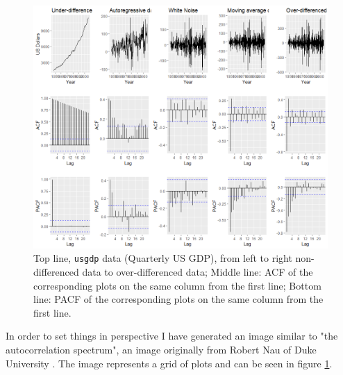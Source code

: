 \documentclass[12pt,a4paper,titlepage]{report}
\begin{document}
\begin{figure}[h]
    \centering
    \includegraphics[width=1\textwidth]{darmadynamics}
    \caption{Top line, \texttt{usgdp} data (Quarterly US GDP), from left to right non-differenced data to over-differenced data; Middle line: ACF of the corresponding plots on the same column from the first line; Bottom line: PACF of the corresponding plots on the same column from the first line.}
    \label{armadynamics}
\end{figure}

In order to set things in perspective I have generated an image similar to "the autocorrelation spectrum", an image originally from Robert Nau of Duke University \cite{nauspectrum}. The image represents a grid of plots and can be seen in figure \ref{armadynamics}.
\end{document}
